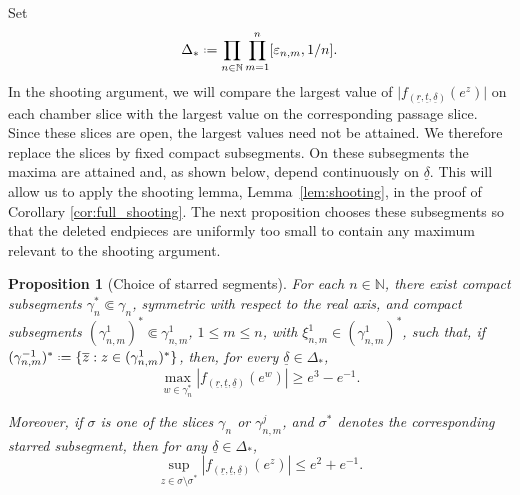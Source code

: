 \documentclass[a4paper, 11pt, reqno]{amsart}
\numberwithin{equation}{section}
\theoremstyle{plain}
\newtheorem{proposition}[theorem]{Proposition}
\newcommand*{\defeq}{\mathrel{\vcenter{\baselineskip0.5ex \lineskiplimit0pt
 \hbox{\scriptsize.}\hbox{\scriptsize.}}}=}
\theoremstyle{remark}
\newcommand{\N}{{\mathbb{N}}}
\newcommand{\uldelta}{\underline{\delta}}
\newcommand{\ulr}{\underline{r}}
\newcommand{\ult}{\underline{t}}
\begin{document}
Set
\[
\Delta_*\defeq
\prod_{n\in\N}\prod_{m=1}^n
[\varepsilon_{n,m},1/n].
\]
In the shooting argument, we will compare the largest value of
	\(\lvert f_{(\ulr,\ult,\uldelta)}(e^z)\rvert\) on each chamber slice with
	the largest value on the corresponding passage slice. Since these slices
	are open, the largest values need not be attained. We therefore replace
	the slices by fixed compact subsegments. On these subsegments the maxima
	are attained and, as shown below, depend continuously on \(\uldelta\). This will allow us to apply the shooting lemma, Lemma~\ref{lem:shooting}, in the proof of Corollary \ref{cor:full_shooting}. The next proposition chooses these subsegments so that the deleted endpieces are uniformly too small to contain any maximum relevant to the shooting argument.


\begin{proposition}[Choice of starred segments]\label{prop:starred_segments}
	For each \(n\in\N\), there exist compact subsegments
	\(\gamma_n^*\Subset\gamma_n\), symmetric with respect to the real axis, and compact subsegments \((\gamma^1_{n,m})^*\Subset\gamma^1_{n,m}\), \(1\le m\le n\), with \(\xi^1_{n,m}\in(\gamma^1_{n,m})^*\), such that, if \((\gamma^{-1}_{n,m})^*\defeq\{\overline z:z\in(\gamma^1_{n,m})^*\}\), then, for every \(\uldelta\in\Delta_*\),
	\begin{equation}\label{eq:starred_segments1}
		\max_{w\in\gamma_n^*}|f_{(\ulr,\ult,\uldelta)}(e^w)|\ge e^3-e^{-1}.
	\end{equation}
	
	Moreover, if \(\sigma\) is one of the slices \(\gamma_n\) or \(\gamma^j_{n,m}\), and \(\sigma^*\) denotes the corresponding starred subsegment, then for any $\uldelta\in\Delta_*$, 
	\[
	\sup_{z\in\sigma\setminus\sigma^*}|f_{(\ulr,\ult,\uldelta)}(e^z)|\le e^2+e^{-1}.
	\]
\end{proposition}
\end{document}
